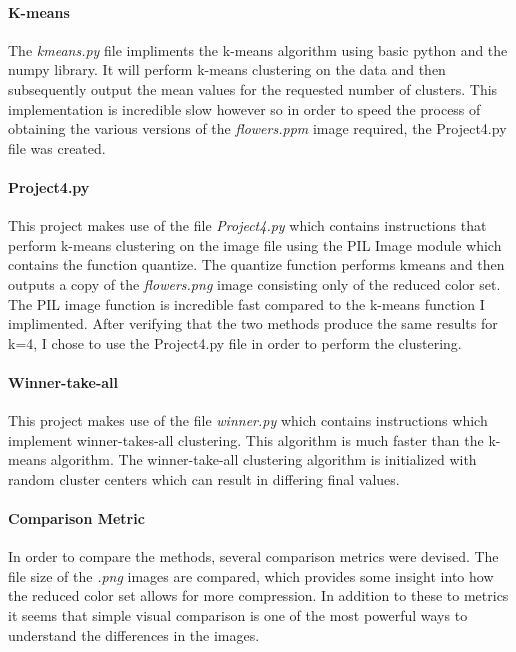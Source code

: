 \documentclass{article}
\begin{document}
\paragraph{K-means} 
The \textit{kmeans.py} file impliments the k-means algorithm using basic
python and the numpy library. It will perform k-means clustering on the 
data and then subsequently output the mean values for the requested number
of clusters. This implementation is incredible slow however so in order to
speed the process of obtaining the various versions of the \textit{flowers.ppm}
image required, the Project4.py file was created. 

\paragraph{Project4.py}
This project makes use of the file \textit{Project4.py} which contains 
instructions that perform k-means clustering on the image file using 
the PIL Image module which contains the function quantize. The quantize
function performs kmeans and then outputs a copy of the \textit{flowers.png} 
image consisting only of the reduced color set. The PIL image function is 
incredible fast compared to the k-means function I implimented. After verifying
that the two methods produce the same results for k=4, I chose to use the 
Project4.py file in order to perform the clustering.

\paragraph{Winner-take-all}
This project makes use of the file \textit{winner.py} which contains instructions
which implement winner-takes-all clustering. This algorithm is much faster than the
k-means algorithm. The winner-take-all clustering algorithm is initialized with random
cluster centers which can result in differing final values.

\paragraph{Comparison Metric}
In order to compare the methods, several comparison metrics were devised. 
The file size of the \textit{.png} images are compared, which provides some
insight into how the reduced color set allows for more compression. In addition
to these to metrics it seems that simple visual comparison is one of the most
powerful ways to understand the differences in the images.
\end{document}
